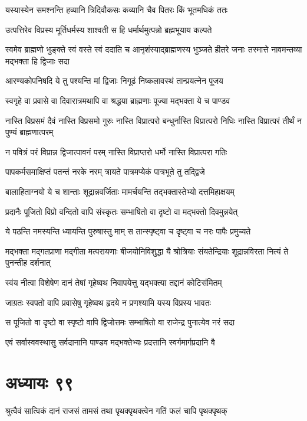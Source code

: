 \twolineshloka
{यस्यास्येन समश्नन्ति हव्यानि त्रिदिवौकसः}
{कव्यानि चैव पितरः किं भूतमधिकं ततः}


\twolineshloka
{उत्पत्तिरेव विप्रस्य मूर्तिधर्मस्य शाश्वती}
{स हि धर्मार्थमुत्पन्नो ब्रह्मभूयाय कल्पते}


\threelineshloka
{स्वमेव ब्राह्मणो भुङ्क्ते स्वं वस्ते स्वं ददाति च}
{आनृशंस्याद्ब्राह्मणस्य भुञ्जते हीतरे जनाः}
{तस्मात्ते नावमन्तव्या मद्भक्ता हि द्विजाः सदा}


\twolineshloka
{आरण्यकोपनिषदि ये तु पश्यन्ति मां द्विजाः}
{निगूढं निष्कलावस्थं तान्प्रयत्नेन पूजय}


\twolineshloka
{स्वगृहे वा प्रवासे वा दिवारात्रमथापि वा}
{श्रद्धया ब्राह्मणाः पूज्या मद्भक्ता ये च पाण्डव}


\fourlineindentedshloka
{नास्ति विप्रसमं दैवं नास्ति विप्रसमो गुरुः}
{नास्ति विप्रात्परो बन्धुर्नास्ति विप्रात्परो निधिः}
{नास्ति विप्रात्परं तीर्थं न पुण्यं ब्राह्मणात्परम्}
{}


\twolineshloka
{न पवित्रं परं विप्रान्न द्विजात्पावनं परम्}
{नास्ति विप्राप्तरो धर्मो नास्ति विप्रात्परा गतिः}


\twolineshloka
{पापकर्मसमाक्षिप्तं पतन्तं नरके नरम्}
{त्रायते पात्रमप्येकं पात्रभूते तु तद्द्विजे}


\twolineshloka
{बालाहिताग्नयो ये च शान्ताः शूद्रान्नवर्जिताः}
{मामर्चयन्ति तद्भक्तास्तेभ्यो दत्तमिहाक्षयम्}


\twolineshloka
{प्रदानैः पूजितो विप्रो वन्दितो वापि संस्कृतः}
{सम्भाषितो वा दृष्टो वा मद्भक्तो दिवमुन्नयेत्}


\twolineshloka
{ये पठन्ति नमस्यन्ति ध्यायन्ति पुरुषास्तु माम्}
{स तान्स्पृष्ट्वा च दृष्ट्वा च नरः पापैः प्रमुच्यते}


\threelineshloka
{मद्भक्ता मद्गतप्राणा मद्गीता मत्परायणाः}
{बीजयोनिविशुद्धा यै श्रोत्रियाः संयतेन्द्रियाः}
{शूद्रान्नविरता नित्यं ते पुनन्तीह दर्शनात्}


\twolineshloka
{स्वंय नीत्वा विशेषेण दानं तेषां गृहेष्वथ}
{निवापयेत्तु यद्भक्त्या तद्दानं कोटिसंमितम्}


\twolineshloka
{जाग्रतः स्वपतो वापि प्रवासेषु गृहेष्वथ}
{हृदये न प्रणश्यामि यस्य विप्रस्य भावतः}


\twolineshloka
{स पूजितो वा दृष्टो वा स्पृष्टो वापि द्विजोत्तमः}
{सम्भाषितो वा राजेन्द्र पुनात्येव नरं सदा}


\twolineshloka
{एवं सर्वास्ववस्थासु सर्वदानानि पाण्डव}
{मद्भक्तेभ्यः प्रदत्तानि स्वर्गमार्गप्रदानि वै}


\chapter{अध्यायः ९९}
\twolineshloka
{श्रुत्वैवं सात्विकं दानं राजसं तामसं तथा}
{पृथक्पृथक्त्वेन गतिं फलं चापि पृथक्पृथक्}


